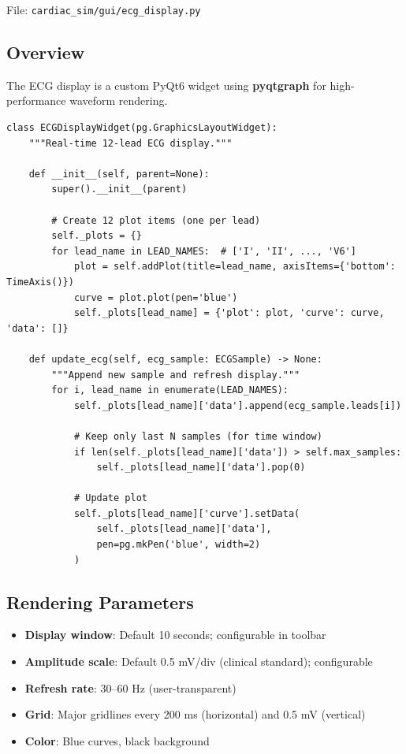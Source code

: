 \documentclass[12pt,a4paper,oneside]{book}
\begin{document}
File: \texttt{cardiac\_sim/gui/ecg\_display.py}

\subsection{Overview}

The ECG display is a custom PyQt6 widget using \textbf{pyqtgraph} for high-performance waveform rendering.

\begin{Verbatim}[formatcom=\color{black}]
class ECGDisplayWidget(pg.GraphicsLayoutWidget):
    """Real-time 12-lead ECG display."""
    
    def __init__(self, parent=None):
        super().__init__(parent)
        
        # Create 12 plot items (one per lead)
        self._plots = {}
        for lead_name in LEAD_NAMES:  # ['I', 'II', ..., 'V6']
            plot = self.addPlot(title=lead_name, axisItems={'bottom': TimeAxis()})
            curve = plot.plot(pen='blue')
            self._plots[lead_name] = {'plot': plot, 'curve': curve, 'data': []}
    
    def update_ecg(self, ecg_sample: ECGSample) -> None:
        """Append new sample and refresh display."""
        for i, lead_name in enumerate(LEAD_NAMES):
            self._plots[lead_name]['data'].append(ecg_sample.leads[i])
            
            # Keep only last N samples (for time window)
            if len(self._plots[lead_name]['data']) > self.max_samples:
                self._plots[lead_name]['data'].pop(0)
            
            # Update plot
            self._plots[lead_name]['curve'].setData(
                self._plots[lead_name]['data'],
                pen=pg.mkPen('blue', width=2)
            )
\end{Verbatim}

\subsection{Rendering Parameters}

\begin{itemize}
    \item \textbf{Display window}: Default 10 seconds; configurable in toolbar
    \item \textbf{Amplitude scale}: Default 0.5 mV/div (clinical standard); configurable
    \item \textbf{Refresh rate}: 30–60 Hz (user-transparent)
    \item \textbf{Grid}: Major gridlines every 200 ms (horizontal) and 0.5 mV (vertical)
    \item \textbf{Color}: Blue curves, black background
\end{itemize}
\end{document}
